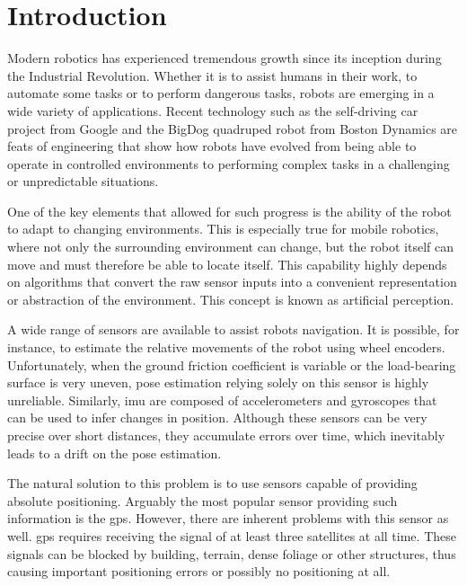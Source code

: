\chapter*{Introduction} 

Modern robotics has experienced tremendous growth since its inception during the Industrial Revolution. Whether it is to assist humans in their work, to automate some tasks or to perform dangerous tasks, robots are emerging in a wide variety of applications. Recent technology such as the self-driving car project from Google and the BigDog quadruped robot from Boston Dynamics are feats of engineering that show how robots have evolved from being able to operate in controlled environments to performing complex tasks in a challenging or unpredictable situations.

One of the key elements that allowed for such progress is the ability of the robot to adapt to changing environments. This is especially true for mobile robotics, where not only the surrounding environment can change, but the robot itself can move and must therefore be able to locate itself. This capability highly depends on algorithms that convert the raw sensor inputs into a convenient representation or abstraction of the environment. This concept is known as artificial perception.

A wide range of sensors are available to assist robots navigation. It is possible, for instance, to estimate the relative movements of the robot using wheel encoders. Unfortunately, when the ground friction coefficient is variable or the load-bearing surface is very uneven, pose estimation relying solely on this sensor is highly unreliable. Similarly, \gls*{imu} are composed of accelerometers and gyroscopes that can be used to infer changes in position. Although these sensors can be very precise over short distances, they accumulate errors over time, which inevitably leads to a drift on the pose estimation.

The natural solution to this problem is to use sensors capable of providing absolute positioning. Arguably the most popular sensor providing such information is the \gls*{gps}. However, there are inherent problems with this sensor as well. \gls*{gps} requires receiving the signal of at least three satellites at all time. These signals can be blocked by building, terrain, dense foliage or other structures, thus causing important positioning errors or possibly no positioning at all.

